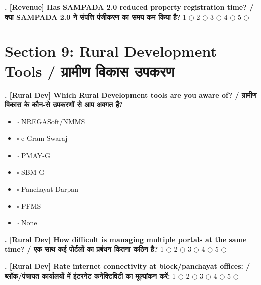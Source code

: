 \documentclass[11pt,a4paper]{article}
\newcounter{qcounter}
\begin{document}
\textbf{. [Revenue] Has SAMPADA 2.0 reduced property registration time? / क्या SAMPADA 2.0 ने संपत्ति पंजीकरण का समय कम किया है?}
\vspace{0.1cm}
\vspace{0.1cm}
1 $\bigcirc$ \hspace{1cm} 2 $\bigcirc$ \hspace{1cm} 3 $\bigcirc$ \hspace{1cm} 4 $\bigcirc$ \hspace{1cm} 5 $\bigcirc$
\vspace{0.4cm}


\section*{Section 9: Rural Development Tools / ग्रामीण विकास उपकरण}
\vspace{0.2cm}
\textbf{. [Rural Dev] Which Rural Development tools are you aware of? / ग्रामीण विकास के कौन-से उपकरणों से आप अवगत हैं?}
\vspace{0.1cm}
\begin{itemize}[label=, itemsep=0.1cm, leftmargin=0.5cm]
    \item $\square$ NREGASoft/NMMS
    \item $\square$ e-Gram Swaraj
    \item $\square$ PMAY-G
    \item $\square$ SBM-G
    \item $\square$ Panchayat Darpan
    \item $\square$ PFMS
    \item $\square$ None
\end{itemize}
\vspace{0.2cm}

\textbf{. [Rural Dev] How difficult is managing multiple portals at the same time? / एक साथ कई पोर्टलों का प्रबंधन कितना कठिन है?}
\vspace{0.1cm}
\vspace{0.1cm}
1 $\bigcirc$ \hspace{1cm} 2 $\bigcirc$ \hspace{1cm} 3 $\bigcirc$ \hspace{1cm} 4 $\bigcirc$ \hspace{1cm} 5 $\bigcirc$
\vspace{0.4cm}

\textbf{. [Rural Dev] Rate internet connectivity at block/panchayat offices: / ब्लॉक/पंचायत कार्यालयों में इंटरनेट कनेक्टिविटी का मूल्यांकन करें:}
\vspace{0.1cm}
\vspace{0.1cm}
1 $\bigcirc$ \hspace{1cm} 2 $\bigcirc$ \hspace{1cm} 3 $\bigcirc$ \hspace{1cm} 4 $\bigcirc$ \hspace{1cm} 5 $\bigcirc$
\vspace{0.4cm}
\end{document}
